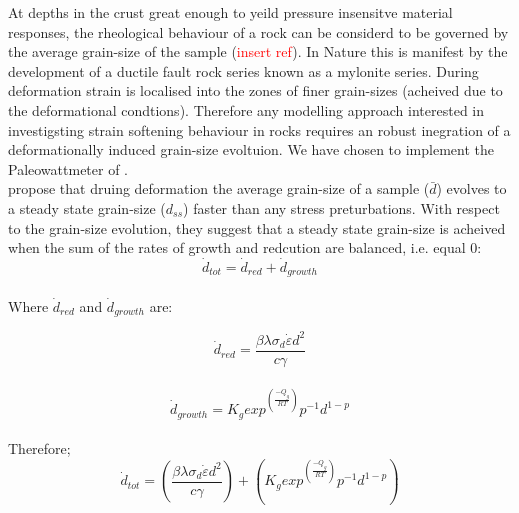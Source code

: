 \documentclass[]{scrreprt}
\begin{document}

At depths in the crust great enough to yeild pressure insensitve material responses, the rheological behaviour of a rock can be considerd to be governed by the average grain-size of the sample (\textcolor{red}{insert ref}). In Nature this is manifest by the development of a ductile fault rock series known as a mylonite series. During deformation strain is localised into the zones of finer grain-sizes (acheived due to the deformational condtions). Therefore any modelling approach interested in investigsting strain softening behaviour in rocks requires an robust inegration of a deformationally induced grain-size evoltuion. We have chosen to implement the Paleowattmeter of \citep{Austin2007}.\\  

\citet{Austin2007} propose that druing deformation the average grain-size of a sample ($\bar{d}$) evolves to a steady state grain-size ($d_{ss}$) faster than any stress preturbations. With respect to the grain-size evolution, they suggest that a steady state grain-size is acheived when the sum of the rates of growth and redcution are balanced, i.e. equal 0:\\

\begin{equation}
 \label{eq:rate_change_dss}
\dot{d}_{tot} = \dot{d}_{red} + \dot{d}_{growth}
\end{equation}\\

Where $\dot{d}_{red}$ and $\dot{d}_{growth}$ are:

\begin{equation}
 \label{eq:d_red}
\dot{d}_{red}=\frac{\beta\lambda\sigma_{d}\dot{\varepsilon}d^2}{c\gamma}
\end{equation}\\

\begin{equation}
 \label{eq:d_growth}
\dot{d}_{growth}=K_g exp^{\left(\frac{-Q_g}{RT}\right)} p^{-1} d^{1-p} 	
\end{equation}\\

Therefore; \:
\begin{equation}
 \label{eq:d_tot}
\dot{d}_{tot} = \left(\frac{\beta\lambda\sigma_{d}\dot{\varepsilon}d^2}{c\gamma}\right) + \left(K_g exp^{\left(\frac{-Q_g}{RT}\right)} p^{-1} d^{1-p}\right)
\end{equation}\\
\end{document}
